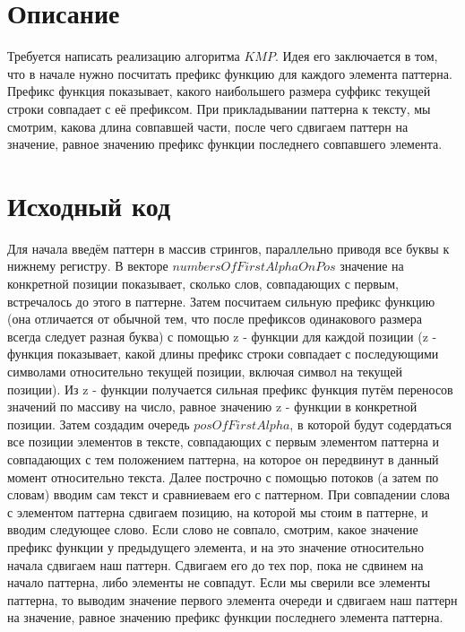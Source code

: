 \section{Описание}
Требуется написать реализацию алгоритма $KMP$. Идея его заключается в том, что в начале нужно посчитать префикс функцию для каждого элемента паттерна. Префикс функция показывает, какого наибольшего размера суффикс текущей строки совпадает с её префиксом. При прикладывании паттерна к тексту, мы смотрим, какова длина совпавшей части, после чего сдвигаем паттерн на значение, равное значению префикс функции последнего совпавшего элемента. 

\pagebreak

\section{Исходный код}

Для начала введём паттерн в массив стрингов, параллельно приводя все буквы к нижнему регистру. В векторе $numbersOfFirstAlphaOnPos$ значение на конкретной позиции показывает, сколько слов, совпадающих с первым, встречалось до этого в паттерне. Затем посчитаем сильную префикс функцию (она отличается от обычной тем, что после префиксов одинакового размера всегда следует разная буква) с помощью z - функции для каждой позиции (z - функция показывает, какой длины префикс строки совпадает с последующими символами относительно текущей позиции, включая символ на текущей позиции). Из z - функции получается сильная префикс функция путём переносов значений по массиву на число, равное значению z - функции в конкретной позиции. Затем создадим очередь $posOfFirstAlpha$, в которой будут содердаться все позиции элементов в тексте, совпадающих с первым элементом паттерна и совпадающих с тем положением паттерна, на которое он передвинут в данный момент относительно текста. Далее построчно с помощью потоков (а затем по словам) вводим сам текст и сравниеваем его с паттерном. При совпадении слова с элементом паттерна сдвигаем позицию, на которой мы стоим в паттерне, и вводим следующее слово. Если слово не совпало, смотрим, какое значение префикс функции у предыдущего элемента, и на это значение относительно начала сдвигаем наш паттерн. Сдвигаем его до тех пор, пока не сдвинем на начало паттерна, либо элементы не совпадут. Если мы сверили все элементы паттерна, то выводим значение первого элемента очереди и сдвигаем наш паттерн на значение, равное значению префикс функции последнего элемента паттерна.

